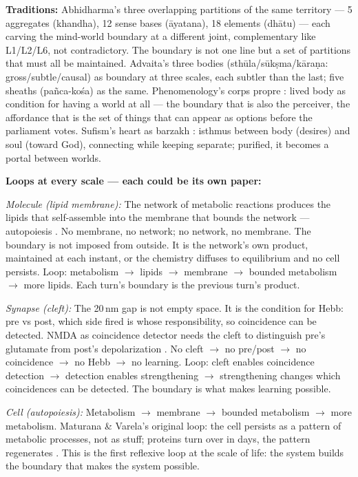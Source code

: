 \documentclass[11pt]{article}
\begin{document}
\textbf{Traditions:} Abhidharma's three overlapping partitions of the same territory --- 5 aggregates (khandha), 12 sense bases (\=ayatana), 18 elements (dh\=atu) --- each carving the mind-world boundary at a different joint, complementary like L1/L2/L6, not contradictory. The boundary is not one line but a set of partitions that must all be maintained. Advaita's three bodies (sth\=ula/s\=uk\d{s}ma/k\=ara\d{n}a: gross/subtle/causal) as boundary at three scales, each subtler than the last; five sheaths (pa\~nca-ko\'sa) as the same. Phenomenology's corps propre \citep{ghazali1106ihya}: lived body as condition for having a world at all --- the boundary that is also the perceiver, the affordance that is the set of things that can appear as options before the parliament votes. Sufism's heart as barzakh \citep{ibnarabi1238futuhat}: isthmus between body (desires) and soul (toward God), connecting while keeping separate; purified, it becomes a portal between worlds.

\textbf{Loops at every scale --- each could be its own paper:}

\textit{Molecule (lipid membrane):} The network of metabolic reactions produces the lipids that self-assemble into the membrane that bounds the network --- autopoiesis \citep{maturana1980}. No membrane, no network; no network, no membrane. The boundary is not imposed from outside. It is the network's own product, maintained at each instant, or the chemistry diffuses to equilibrium and no cell persists. Loop: metabolism $\to$ lipids $\to$ membrane $\to$ bounded metabolism $\to$ more lipids. Each turn's boundary is the previous turn's product.

\textit{Synapse (cleft):} The 20\,nm gap is not empty space. It is the condition for Hebb: pre vs post, which side fired is whose responsibility, so coincidence can be detected. NMDA as coincidence detector needs the cleft to distinguish pre's glutamate from post's depolarization \citep{tononi2014}. No cleft $\to$ no pre/post $\to$ no coincidence $\to$ no Hebb $\to$ no learning. Loop: cleft enables coincidence detection $\to$ detection enables strengthening $\to$ strengthening changes which coincidences can be detected. The boundary is what makes learning possible.

\textit{Cell (autopoiesis):} Metabolism $\to$ membrane $\to$ bounded metabolism $\to$ more metabolism. Maturana \& Varela's original loop: the cell persists as a pattern of metabolic processes, not as stuff; proteins turn over in days, the pattern regenerates \citep{maturana1980}. This is the first reflexive loop at the scale of life: the system builds the boundary that makes the system possible.
\end{document}
